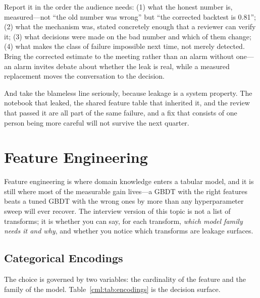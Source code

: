 Report it in the order the audience needs: (1) what the honest number is, measured---not ``the old number was wrong'' but ``the corrected backtest is 0.81''; (2) what the mechanism was, stated concretely enough that a reviewer can verify it; (3) what decisions were made on the bad number and which of them change; (4) what makes the class of failure impossible next time, not merely detected. Bring the corrected estimate to the meeting rather than an alarm without one---an alarm invites debate about whether the leak is real, while a measured replacement moves the conversation to the decision.

And take the blameless line seriously, because leakage is a system property. The notebook that leaked, the shared feature table that inherited it, and the review that passed it are all part of the same failure, and a fix that consists of one person being more careful will not survive the next quarter.

\section{Feature Engineering}
\label{cml:sec:feature_engineering}

Feature engineering is where domain knowledge enters a tabular model, and it is still where most of the measurable gain lives---a GBDT with the right features beats a tuned GBDT with the wrong ones by more than any hyperparameter sweep will ever recover. The interview version of this topic is not a list of transforms; it is whether you can say, for each transform, \emph{which model family needs it and why}, and whether you notice which transforms are leakage surfaces.

\subsection{Categorical Encodings}

The choice is governed by two variables: the cardinality of the feature and the family of the model. Table~\ref{cml:tab:encodings} is the decision surface.

